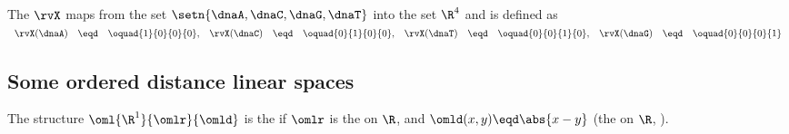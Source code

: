 \begin{definition}
\label{def:rv_dnaR4}
The  $\rvX$ maps from the set $\setn{\dnaA,\dnaC,\dnaG,\dnaT}$ into the set $\R^4$
and is defined as\footnotemark
\\\indentx$\begin{array}{rclrclrclrcl}
     \rvX(\dnaA) &\eqd& \oquad{1}{0}{0}{0}, 
    &\rvX(\dnaC) &\eqd& \oquad{0}{1}{0}{0}, 
    &\rvX(\dnaT) &\eqd& \oquad{0}{0}{1}{0}, 
    &\rvX(\dnaG) &\eqd& \oquad{0}{0}{0}{1}
\end{array}$
\end{definition}


\subsection{Some ordered distance linear spaces}
\begin{definition}
\label{def:dieR1oml}
The structure $\oml{\R^1}{\omlr}{\omld}$ is the 
if $\omlr$ is the  on $\R$, 
and $\omld(x,y)\eqd\abs{x-y}$ (the  on $\R$, ).
\end{definition}

